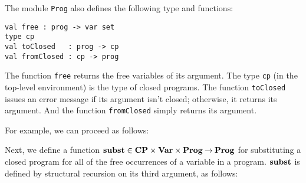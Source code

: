 The module \texttt{Prog} also defines the following type and
functions:
\begin{verbatim}
val free : prog -> var set
type cp
val toClosed   : prog -> cp
val fromClosed : cp -> prog
\end{verbatim}
The function \texttt{free} returns the free variables of its argument.
The type \texttt{cp} (in the top-level environment) is the type of
closed programs.  The function \texttt{toClosed} issues an error message
if its argument isn't closed; otherwise, it returns its argument.
And the function \texttt{fromClosed} simply returns its argument.

For example, we can proceed as follows:


Next, we define a function
$\mathbf{subst}\in\mathbf{CP}\times\mathbf{Var}\times\mathbf{Prog}\mathbin{\to}\mathbf{Prog}$ for substituting a
closed program for all of the free occurrences of a variable in a
program.  $\mathbf{subst}$ is defined by structural recursion on its third
argument, as follows:
